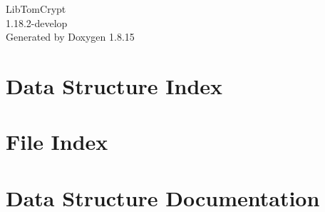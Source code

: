\let\mypdfximage\pdfximage\def\pdfximage{\immediate\mypdfximage}\documentclass[twoside]{book}
\newcommand{\+}{\discretionary{\mbox{\scriptsize$\hookleftarrow$}}{}{}}
\newcommand{\clearemptydoublepage}{%
  \newpage{\pagestyle{empty}\cleardoublepage}%
}
\begin{document}
\hypersetup{pageanchor=false,
             bookmarksnumbered=true,
             pdfencoding=unicode
            }
\begin{titlepage}
\vspace*{7cm}
\begin{center}%
{\Large Lib\+Tom\+Crypt \\[1ex]\large 1.\+18.\+2-\/develop }\\
\vspace*{1cm}
{\large Generated by Doxygen 1.8.15}\\
\end{center}
\end{titlepage}
\clearemptydoublepage
{}
\tableofcontents
\clearemptydoublepage
{}
\hypersetup{pageanchor=true}

\chapter{Data Structure Index}

\chapter{File Index}

\chapter{Data Structure Documentation}

















\end{document}
